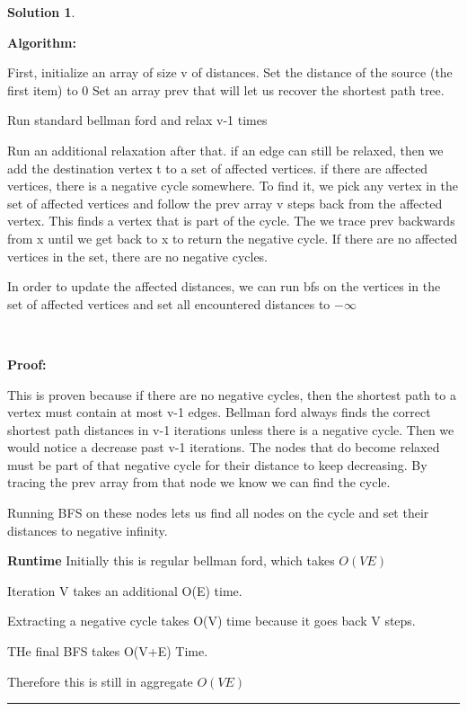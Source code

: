 \documentclass{article}
\theoremstyle{definition}
\def\fline{\rule{0.75\linewidth}{0.5pt}}
\newcommand{\finishline}{\begin{center}\fline\end{center}}
\newtheorem*{solution*}{Solution}
\newenvironment{solution}{\begin{solution*}}{{\finishline} \end{solution*}}
\begin{document}
\begin{solution}
    \

    \textbf{Algorithm: }
    \

    First, initialize an array of size v of distances. Set the distance of the source (the first item) to 0 
    Set an array prev that will let us recover the shortest path tree.

    Run standard bellman ford and relax v-1 times

    Run an additional relaxation after that. if an edge can still be relaxed, then we add the destination vertex t to a set of affected vertices. 
    if there are affected vertices, there is a negative cycle somewhere. To find it, we pick any vertex in the set of affected vertices and follow the prev array v steps back from the affected vertex. This finds a vertex that is part of the cycle. The we trace prev backwards from x until we get back to x to return the negative cycle. 
    If there are no affected vertices in the set, there are no negative cycles.

    In order to update the affected distances, we can run bfs on the vertices in the set of affected vertices and set all encountered distances to $-\infty$
    
    \

    \textbf{Proof: }

    This is proven because if there are no negative cycles, then the shortest path to a vertex must contain at most v-1 edges. Bellman ford always finds the correct shortest path distances in v-1 iterations unless there is a negative cycle. Then we would notice a decrease past v-1 iterations. 
    The nodes that do become relaxed must be part of that negative cycle for their distance to keep decreasing. By tracing the prev array from that node we know we can find the cycle.

    Running BFS on these nodes lets us find all nodes on the cycle and set their distances to negative infinity.

    \textbf{Runtime}
        Initially this is regular bellman ford, which takes $O(V E)$

        Iteration V takes an additional O(E) time.

        Extracting a negative cycle takes O(V) time because it goes back V steps.

        THe final BFS takes O(V+E) Time.


        Therefore this is still in aggregate $O(V E)$
\end{solution}
\end{document}
